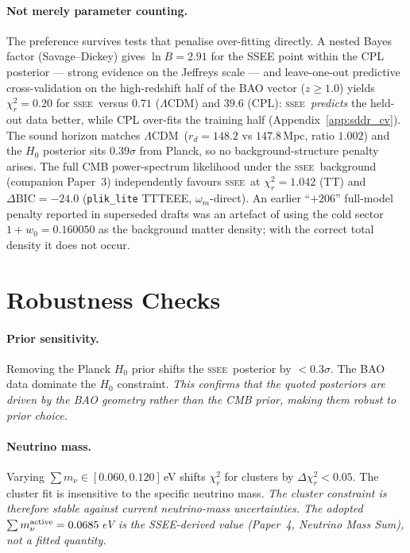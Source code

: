 \documentclass[12pt,a4paper]{article}
\newcommand{\SSEE}{\ifmmode\mathrm{SSEE}\else\textsc{ssee}\fi}
\newcommand{\LCDM}{\ifmmode\Lambda\mathrm{CDM}\else$\Lambda$CDM\fi}
\begin{document}
\paragraph{Not merely parameter counting.}
The preference survives tests that penalise over-fitting directly. A nested
Bayes factor (Savage--Dickey) gives $\ln B=2.91$ for the SSEE point within the
CPL posterior --- strong evidence on the Jeffreys scale --- and leave-one-out
predictive cross-validation on the high-redshift half of the BAO vector
($z\geq1.0$) yields $\chi^2_r=0.20$ for \SSEE\ versus $0.71$ (\LCDM) and $39.6$
(CPL): \SSEE\ \emph{predicts} the held-out data better, while CPL over-fits the
training half (Appendix~\ref{app:sddr_cv}). The sound horizon matches \LCDM\
($r_d=148.2$ vs $147.8$\,Mpc, ratio $1.002$) and the $H_0$ posterior sits
$0.39\sigma$ from Planck, so no background-structure penalty arises. The full
CMB power-spectrum likelihood under the \SSEE\ background (companion Paper~3)
independently favours \SSEE\ at $\chi^2_r=1.042$ (TT) and $\Delta\mathrm{BIC}=
-24.0$ (\texttt{plik\_lite} TTTEEE, $\omega_m$-direct). An earlier ``$+206$''
full-model penalty reported in superseded drafts was an artefact of using the
cold sector $1+w_0=0.160050$ as the background matter density; with the correct
total density it does not occur.

\section{Robustness Checks}
\label{sec:robustness}

\paragraph{Prior sensitivity.}
Removing the Planck $H_0$ prior shifts the \SSEE\ posterior by
$<0.3\sigma$. The BAO data dominate the $H_0$ constraint.
\textit{This confirms that the quoted posteriors are driven by the BAO
geometry rather than the CMB prior, making them robust to prior choice.}

\paragraph{Neutrino mass.}
Varying $\sum m_\nu\in[0.060,0.120]$\,eV shifts $\chi^2_r$ for
clusters by $\Delta\chi^2_r<0.05$. The cluster fit is insensitive
to the specific neutrino mass.
\textit{The cluster constraint is therefore stable against current
neutrino-mass uncertainties. The adopted $\sum m_\nu^{\rm active}=0.0685$\,eV
is the SSEE-derived value (Paper~4, Neutrino Mass Sum), not a fitted
quantity.}%
\end{document}
